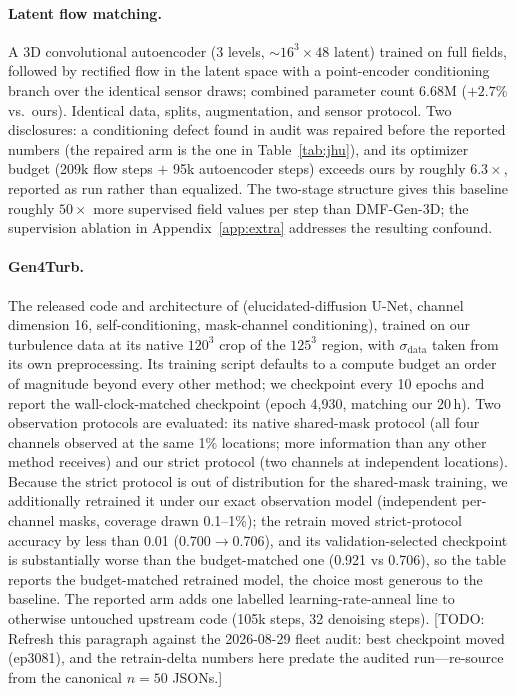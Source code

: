 \documentclass{article} %
\newcommand{\todo}[1]{{\color{red}[TODO: #1]}}
\newcommand{\model}{DMF-Gen-3D}
\begin{document}
\paragraph{Latent flow matching.} A 3D convolutional autoencoder (3 levels, $\sim$$16^3\times48$ latent) trained on full fields, followed by rectified flow in the latent space with a point-encoder conditioning branch over the identical sensor draws; combined parameter count 6.68M ($+2.7$\% vs.\ ours). Identical data, splits, augmentation, and sensor protocol. Two disclosures: a conditioning defect found in audit was repaired before the reported numbers (the repaired arm is the one in Table~\ref{tab:jhu}), and its optimizer budget (209k flow steps $+$ 95k autoencoder steps) exceeds ours by roughly $6.3\times$, reported as run rather than equalized. The two-stage structure gives this baseline roughly $50\times$ more supervised field values per step than \model{}; the supervision ablation in Appendix~\ref{app:extra} addresses the resulting confound.

\paragraph{Gen4Turb.} The released code and architecture of \citet{oommen2026turbulent} (elucidated-diffusion U-Net, channel dimension 16, self-conditioning, mask-channel conditioning), trained on our turbulence data at its native $120^3$ crop of the $125^3$ region, with $\sigma_{\mathrm{data}}$ taken from its own preprocessing. Its training script defaults to a compute budget an order of magnitude beyond every other method; we checkpoint every 10 epochs and report the wall-clock-matched checkpoint (epoch 4{,}930, matching our 20\,h). Two observation protocols are evaluated: its native shared-mask protocol (all four channels observed at the same 1\% locations; more information than any other method receives) and our strict protocol (two channels at independent locations). Because the strict protocol is out of distribution for the shared-mask training, we additionally retrained it under our exact observation model (independent per-channel masks, coverage drawn 0.1--1\%); the retrain moved strict-protocol accuracy by less than 0.01 (0.700$\to$0.706), and its validation-selected checkpoint is substantially worse than the budget-matched one (0.921 vs 0.706), so the table reports the budget-matched retrained model, the choice most generous to the baseline. The reported arm adds one labelled learning-rate-anneal line to otherwise untouched upstream code (105k steps, 32 denoising steps). \todo{Refresh this paragraph against the 2026-08-29 fleet audit: best checkpoint moved (ep3081), and the retrain-delta numbers here predate the audited run---re-source from the canonical $n{=}50$ JSONs.}
\end{document}
